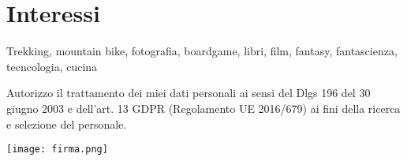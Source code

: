 \documentclass[10pt]{article}
\begin{document}

\section{Interessi}
\vspace{-0.5em}
Trekking, mountain bike, fotografia, boardgame, libri, film, fantasy, fantascienza, tecncologia, cucina



\vspace*{\fill}
\noindent \small{Autorizzo il trattamento dei miei dati personali ai sensi del Dlgs 196 del 30 giugno 2003 e dell’art. 13 GDPR (Regolamento UE 2016/679) ai fini della ricerca e selezione del personale.}
\vspace{-1em}
\begin{flushright}
	\texttt{[image: firma.png]}
\end{flushright}
\end{document}
